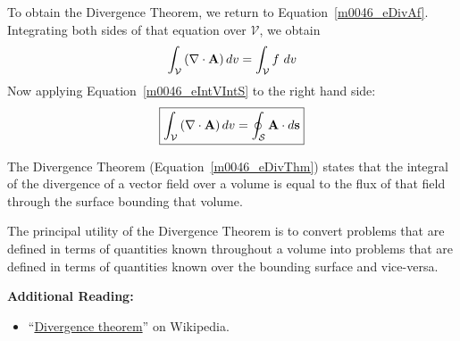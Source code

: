 To obtain the Divergence Theorem, we return to Equation~\ref{m0046_eDivAf}.  Integrating both sides of that equation over ${\mathcal V}$, we obtain    
%
\begin{equation}
\int_{\mathcal V} \left( \nabla \cdot {\bf A} \right) dv = \int_{\mathcal V} f ~dv
\end{equation}
%
Now applying Equation~\ref{m0046_eIntVIntS} to the right hand side:
%
\begin{equation}
\boxed{
\int_{\mathcal V} \left( \nabla \cdot {\bf A} \right) dv = \oint_{\mathcal S} {\bf A}\cdot d{\bf s}
}
\label{m0046_eDivThm}
\end{equation}

\begin{mdframed}[backgroundcolor=yellow!20,nobreak=true] 
The Divergence Theorem 
(Equation~\ref{m0046_eDivThm}) states that the integral of the divergence of a vector field over a volume is equal to the flux of that field through the surface bounding that volume. 
\end{mdframed}

The principal utility of the Divergence Theorem is to convert problems that are defined in terms of quantities known throughout a volume into problems that are defined in terms of quantities known over the bounding surface and vice-versa.


{\bf Additional Reading:}
\begin{itemize}
\item ``\href{https://en.wikipedia.org/wiki/Divergence_theorem}{Divergence theorem}'' on Wikipedia.
\end{itemize}
